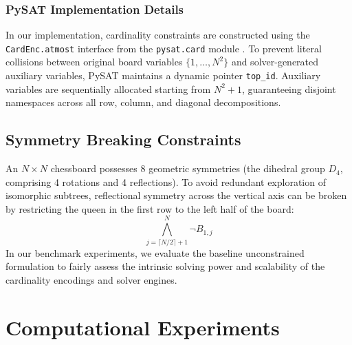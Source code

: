 \documentclass[a4paper,fleqn]{cas-sc}
\begin{document}
\subsubsection{PySAT Implementation Details}
In our implementation, cardinality constraints are constructed using the \texttt{CardEnc.atmost} interface from the \texttt{pysat.card} module \cite{ignatiev2018pysat}. To prevent literal collisions between original board variables $\{1, \dots, N^2\}$ and solver-generated auxiliary variables, PySAT maintains a dynamic pointer \texttt{top\_id}. Auxiliary variables are sequentially allocated starting from $N^2 + 1$, guaranteeing disjoint namespaces across all row, column, and diagonal decompositions.

\subsection{Symmetry Breaking Constraints}
\label{subsec:symmetry_breaking}
An $N \times N$ chessboard possesses 8 geometric symmetries (the dihedral group $D_4$, comprising 4 rotations and 4 reflections). To avoid redundant exploration of isomorphic subtrees, reflectional symmetry across the vertical axis can be broken by restricting the queen in the first row to the left half of the board:
\begin{equation}
    \bigwedge_{j = \lceil N/2 \rceil + 1}^{N} \neg B_{1, j} \label{eq:symmetry_breaking}
\end{equation}
In our benchmark experiments, we evaluate the baseline unconstrained formulation to fairly assess the intrinsic solving power and scalability of the cardinality encodings and solver engines.

\section{Computational Experiments}
\label{sec:experiments}
\end{document}
